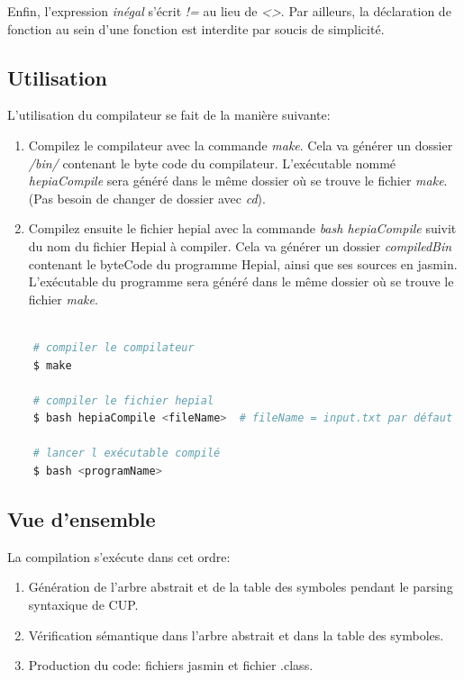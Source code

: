 \documentclass[11pt,a4paper]{article}
\begin{document}
     \par Enfin, l'expression \textit{inégal} s'écrit \textit{!=} au lieu de \textit{<>}. Par ailleurs, la déclaration de fonction au sein d'une fonction est interdite par soucis de simplicité.
     
  \subsection{Utilisation}
  
  \par L'utilisation du compilateur se fait de la manière suivante: 

  \begin{enumerate}
  \item Compilez le compilateur avec la commande \textit{make}. Cela va générer un dossier \textit{/bin/} contenant le byte code du compilateur. L'exécutable nommé \textit{hepiaCompile} sera généré dans le même dossier où se trouve le fichier \textit{make}. (Pas besoin de changer de dossier avec \textit{cd}).  
  \item Compilez ensuite le fichier hepial avec la commande \textit{bash hepiaCompile} suivit du nom du fichier Hepial à compiler. Cela va générer un dossier \textit{compiledBin} contenant le byteCode du programme Hepial, ainsi que ses sources en jasmin. L’exécutable du programme sera généré dans le même dossier où se trouve le fichier \textit{make}.
  \end{enumerate}
  
  \begin{lstlisting}[language=bash,caption={Utilisation du compilateur}]
    
    # compiler le compilateur
    $ make 
    
    # compiler le fichier hepial
    $ bash hepiaCompile <fileName>  # fileName = input.txt par défaut
    
    # lancer l exécutable compilé
    $ bash <programName>
  \end{lstlisting}

\newpage  
  
  \subsection{Vue d'ensemble}
  
  \par La compilation s'exécute dans cet ordre:
  \begin{enumerate}
    \item Génération de l'arbre abstrait et de la table des symboles pendant le parsing syntaxique de CUP. 
    \item Vérification sémantique dans l'arbre abstrait et dans la table des symboles. 
    \item Production du code: fichiers jasmin et fichier .class. 
  \end{enumerate}
  
\end{document}
